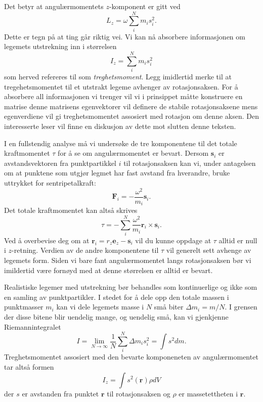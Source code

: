 \documentclass[twoside,utf8]{article}
\begin{document}
Det betyr at angulærmomentets $z$-komponent er gitt ved
\[
L_z = \omega \sum_i^N m_i s_i^2.
\]
Dette er tegn på at ting går riktig vei. Vi kan nå absorbere informasjonen om legemets utstrekning inn i størrelsen
\[
I_z = \sum_i^N m_i s_i^2
\]
som herved refereres til som {\it treghetsmoment}. Legg imidlertid merke til at tregehetsmomentet til et utstrakt legeme avhenger av rotasjonsaksen. For å absorbere all informasjonen vi trenger vil vi i prinsippet måtte konstruere en matrise denne matrisens egenvektorer vil definere de stabile rotasjonsaksene mens egenverdiene vil gi treghetsmomentet assosiert med rotasjon om denne aksen. Den interesserte leser vil finne en diskusjon av dette mot slutten denne teksten.

I en fullstendig analyse må vi undersøke de tre komponentene til det totale kraftmomentet $\tau$ for å se om angulærmomentet er bevart. Dersom $\mathbf{s}_i$ er avstandsvektoren fra punktpartikkel $i$ til rotasjonsaksen kan vi, under antagelsen om at punktene som utgjør legmet har fast avstand fra hverandre, bruke uttrykket for sentripetalkraft:
\[
\mathbf{F}_i = -\frac{\omega^2}{m_i}\mathbf{s}_i.
\]
Det totale kraftmomentet kan altså skrives
\[
\tau = -\sum_i^N \frac{\omega^2}{m_i} \mathbf{r}_i \times \mathbf{s}_i.
\]
Ved å overbevise deg om at $\mathbf{r}_i = r_z\mathbf{e}_z-\mathbf{s}_i$ vil du kunne oppdage at $\tau$ alltid er null i $z$-retning. Verdien av de andre komponentene til $\tau$ vil generelt sett avhenge av legemets form. Siden vi bare fant angulærmomentet langs rotasjonsaksen bør vi imildertid være fornøyd med at denne størrelsen er alltid er bevart.

Realistiske legemer med utstrekning bør behandles som kontinuerlige og ikke som en samling av punktpartikler. I stedet for å dele opp den totale massen i punktmasser $m_i$ kan vi dele legemets masse i $N$ små biter $\Delta m_i = m/N$. I grensen der disse bitene blir uendelig mange, og uendelig små, kan vi gjenkjenne Riemannintegralet
\[
I
= \lim_{N\rightarrow \infty} \frac{1}{N} \sum_i^N \Delta m_i s_i^2
= \int s^2 dm.
\]
Treghetsmomentet assosiert med den bevarte komponeneten av angulærmomentet tar altså formen
\[
I_z = \int  s^2(\mathbf{r}) \rho dV
\]
der $s$ er avstanden fra punktet $\mathbf{r}$ til rotasjonsaksen og $\rho$ er massetettheten i $\mathbf{r}$.
\end{document}
